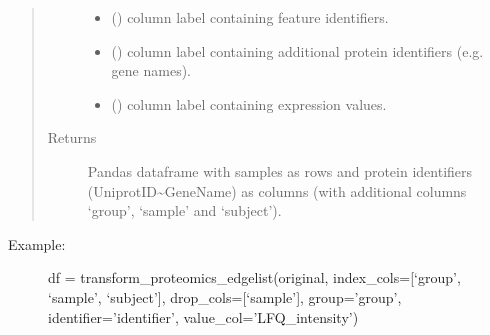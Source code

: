 \documentclass[letterpaper,10pt,english]{sphinxmanual}
\begin{document}
\begin{fulllineitems}
\begin{quote}
\begin{description}
\begin{itemize}
\item {} 
 () \textendash{} column label containing feature identifiers.

\item {} 
 () \textendash{} column label containing additional protein identifiers (e.g. gene names).

\item {} 
 () \textendash{} column label containing expression values.

\end{itemize}

\item[{Returns}] \leavevmode
Pandas dataframe with samples as rows and protein identifiers (UniprotID\textasciitilde{}GeneName) as columns (with additional columns ‘group’, ‘sample’ and ‘subject’).

\end{description}\end{quote}
\begin{description}
\item[{Example:}] \leavevmode
df = transform\_proteomics\_edgelist(original, index\_cols={[}‘group’, ‘sample’, ‘subject’{]}, drop\_cols={[}‘sample’{]}, group=’group’, identifier=’identifier’, value\_col=’LFQ\_intensity’)

\end{description}

\end{fulllineitems}

\end{document}
